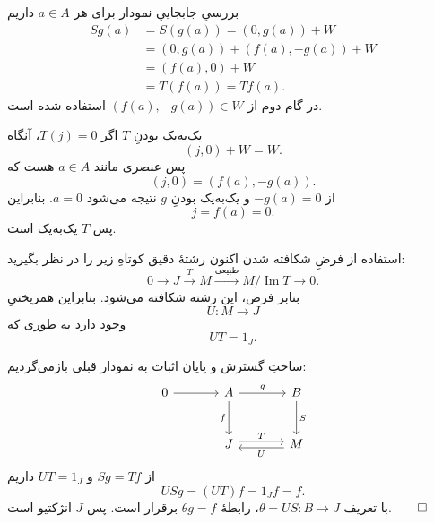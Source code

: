 \begin{frame}[t]{بررسیِ جابجاییِ نمودار}
  \label{lec18:pushout-commutativity}
  برای هر $a\in A$ داریم
  \[
    \begin{aligned}
      Sg(a)&=S(g(a))=(0,g(a))+W\\
       &=(0,g(a))+(f(a),-g(a))+W\\
       &=(f(a),0)+W\\
       &=T(f(a))=Tf(a).
    \end{aligned}
  \]
  در گام دوم از $(f(a),-g(a))\in W$ استفاده شده است.
\end{frame}

\begin{frame}[t]{یک‌به‌یک بودنِ $T$}
  \label{lec18:pushout-monomorphism}
  اگر $T(j)=0$، آنگاه
  \[
    (j,0)+W=W.
  \]
  پس عنصری مانند $a\in A$ هست که
  \[
    (j,0)=(f(a),-g(a)).
  \]
  از $-g(a)=0$ و یک‌به‌یک بودنِ $g$ نتیجه می‌شود $a=0$.
  بنابراین
  \[
    j=f(a)=0.
  \]
  پس $T$ یک‌به‌یک است.
\end{frame}

\begin{frame}[t]{استفاده از فرضِ شکافته شدن}
  \label{lec18:pushout-retraction}
  اکنون رشتهٔ دقیق کوتاهِ زیر را در نظر بگیرید:
  \[
    0\longrightarrow J\xrightarrow{\ T\ }M
    \xrightarrow{\text{طبیعی}}M/\operatorname{Im}T\longrightarrow0.
  \]
  بنابر فرض، این رشته شکافته می‌شود. بنابراین همریختیِ
  \[
    U:M\longrightarrow J
  \]
  وجود دارد به طوری که
  \[
    UT=1_J.
  \]
\end{frame}

\begin{frame}[t]{ساختِ گسترش و پایان اثبات}
  \label{lec18:pushout-extension}
  به نمودار قبلی بازمی‌گردیم:
  \[
    \begin{tikzcd}[ampersand replacement=\&,column sep=large,row sep=large]
      0 \arrow[r] \& A \arrow[r,"g"] \arrow[d,"f"']
        \& B \arrow[d,"S"] \\
      \& J \arrow[r,shift left,"T"]
        \& M \arrow[l,shift left,"U"]
    \end{tikzcd}
  \]
  از $Sg=Tf$ و $UT=1_J$ داریم
  \[
    USg=(UT)f=1_Jf=f.
  \]
  با تعریف $\theta=US:B\to J$، رابطهٔ $\theta g=f$ برقرار است.
  پس $J$ انژکتیو است.\hfill$\qed$
\end{frame}

